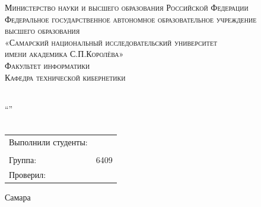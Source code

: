 \begin{titlepage}
							
	\center
							
							
	\textsc{Министерство науки и высшего образования Российской Федерации}\\[-0.15cm]
	\textsc{Федеральное государственное автономное образовательное учреждение \\[-0.15cm] высшего образования}\\[-0.15cm] 
	\textsc{«Самарский национальный исследовательский университет \\[-0.15cm] имени академика С.П.Королёва»}\\[0.25cm]
	\textsc{Факультет информатики}\\[0.1cm]
	\textsc{Кафедра технической кибернетики}\\[0.5cm]
						
							
	\vfill\vfill
						    
							
	{\subjectTitle}\\[0.3cm]
	
	{\enquote{\taskTitle}}\\[0.5cm]
						  
    {\textbf{\theme}}\\[0.5cm]

    \vfill\vfill\vfill
							
	\begin{minipage}{1\textwidth}
		\begin{center}
			\begin{tabularx}{\textwidth}{X l}
				Выполнили студенты:        & \firstAuthorSurName \firstAuthorInitials \\
				                           & \secondAuthorSurName \secondAuthorInitials \\
				Группа:                    & 6409                     		           \\
				Проверил:                  & \teacherName         		                \\
			\end{tabularx}
		\end{center}
	\end{minipage}
							
						
							
	\vfill\vfill\vfill
					
	{\centering Самара \the\year}
							
							
\end{titlepage}

